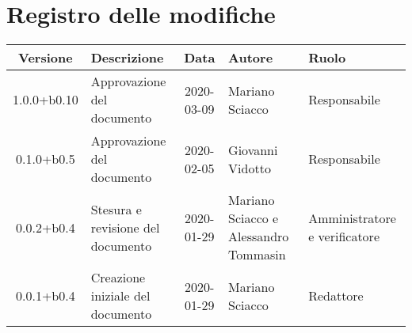 \section*{Registro delle modifiche}

\begin{center}
	\begin{longtable}{|c|p{3.5cm}|c|p{3cm}|p{3cm}|}
	\hline
	\rowcolor{lighter-grayer}
	\textbf{Versione} & \textbf{Descrizione} & \textbf{Data} & \textbf{Autore} & \textbf{Ruolo} \\
	\hline
	\endfirsthead

	1.0.0+b0.10 & Approvazione del documento & 2020-03-09 & Mariano Sciacco & Responsabile \\
	\hline
	0.1.0+b0.5 & Approvazione del documento & 2020-02-05 & Giovanni Vidotto & Responsabile \\
	\hline
	0.0.2+b0.4 & Stesura e revisione del documento & 2020-01-29 & Mariano Sciacco e Alessandro Tommasin & Amministratore e verificatore \\
	\hline
	0.0.1+b0.4 & Creazione iniziale del documento & 2020-01-29 & Mariano Sciacco & Redattore \\
	\hline

	\end{longtable}
\end{center}